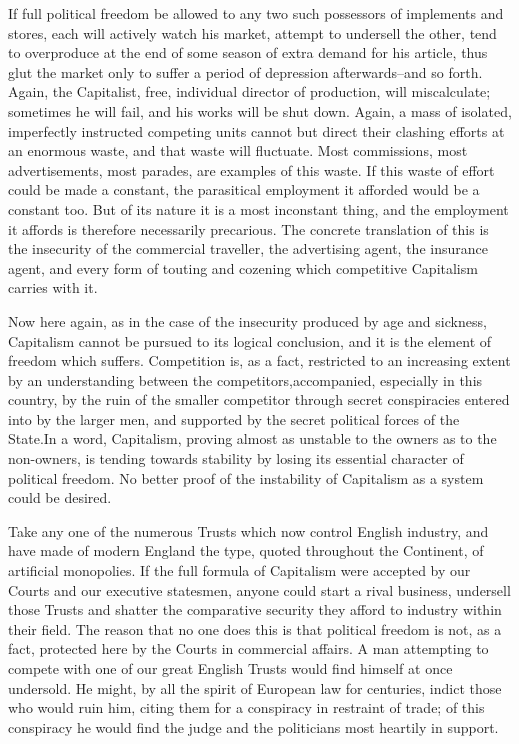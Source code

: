 \documentclass{book}
\begin{document}
If full political freedom be allowed to any two such possessors of implements and stores, each will actively watch his market, attempt to undersell the other, tend to overproduce at the end of some season of extra demand for his article, thus glut the market only to suffer a period of depression afterwards–and so forth. Again, the Capitalist, free, individual director of production, will miscalculate; sometimes he will fail, and his works will be shut down. Again, a mass of isolated, imperfectly instructed competing units cannot but direct their clashing efforts at an enormous waste, and that waste will fluctuate. Most commissions, most advertisements, most parades, are examples of this waste. If this waste of effort could be made a constant, the parasitical employment it afforded would be a constant too. But of its nature it is a most inconstant thing, and the employment it affords is therefore necessarily precarious. The concrete translation of this is the insecurity of the commercial traveller, the advertising agent, the insurance agent, and every form of touting and cozening which competitive Capitalism carries with it.

Now here again, as in the case of the insecurity produced by age and sickness, Capitalism cannot be pursued to its logical conclusion, and it is the element of freedom which suffers. Competition is, as a fact, restricted to an increasing extent by an understanding between the competitors,accompanied, especially in this country, by the ruin of the smaller competitor through secret conspiracies entered into by the larger men, and supported by the secret political forces of the State.\footnotemark[1] In a word, Capitalism, proving almost as unstable to the owners as to the non-owners, is tending towards stability by losing its essential character of political freedom. No better proof of the instability of Capitalism as a system could be desired.

Take any one of the numerous Trusts which now control English industry, and have made of modern England the type, quoted throughout the Continent, of artificial monopolies. If the full formula of Capitalism were accepted by our Courts and our executive statesmen, anyone could start a rival business, undersell those Trusts and shatter the comparative security they afford to industry within their field. The reason that no one does this is that political freedom is not, as a fact, protected here by the Courts in commercial affairs. A man attempting to compete with one of our great English Trusts would find himself at once undersold. He might, by all the spirit of European law for centuries, indict those who would ruin him, citing them for a conspiracy in restraint of trade; of this conspiracy he would find the judge and the politicians most heartily in support.
\end{document}
